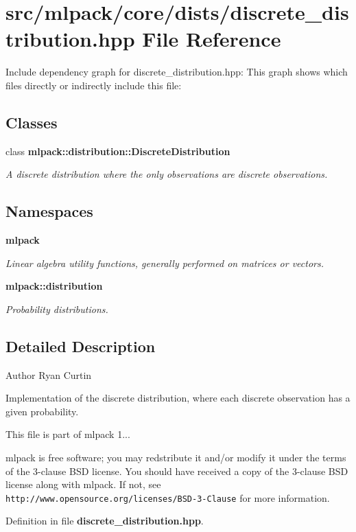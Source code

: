\section{src/mlpack/core/dists/discrete\-\_\-distribution.hpp File Reference}
\label{discrete__distribution_8hpp}
Include dependency graph for discrete\-\_\-distribution.\-hpp\-:
This graph shows which files directly or indirectly include this file\-:
\subsection*{Classes}
\begin{DoxyCompactItemize}
\item 
class {\bf mlpack\-::distribution\-::\-Discrete\-Distribution}
\begin{DoxyCompactList}\small\item\em A discrete distribution where the only observations are discrete observations. \end{DoxyCompactList}\end{DoxyCompactItemize}
\subsection*{Namespaces}
\begin{DoxyCompactItemize}
\item 
{\bf mlpack}
\begin{DoxyCompactList}\small\item\em Linear algebra utility functions, generally performed on matrices or vectors. \end{DoxyCompactList}\item 
{\bf mlpack\-::distribution}
\begin{DoxyCompactList}\small\item\em Probability distributions. \end{DoxyCompactList}\end{DoxyCompactItemize}


\subsection{Detailed Description}
\begin{DoxyAuthor}{Author}
Ryan Curtin
\end{DoxyAuthor}
Implementation of the discrete distribution, where each discrete observation has a given probability.

This file is part of mlpack 1...

mlpack is free software; you may redstribute it and/or modify it under the terms of the 3-\/clause B\-S\-D license. You should have received a copy of the 3-\/clause B\-S\-D license along with mlpack. If not, see {\tt http\-://www.\-opensource.\-org/licenses/\-B\-S\-D-\/3-\/\-Clause} for more information. 

Definition in file {\bf discrete\-\_\-distribution.\-hpp}.

